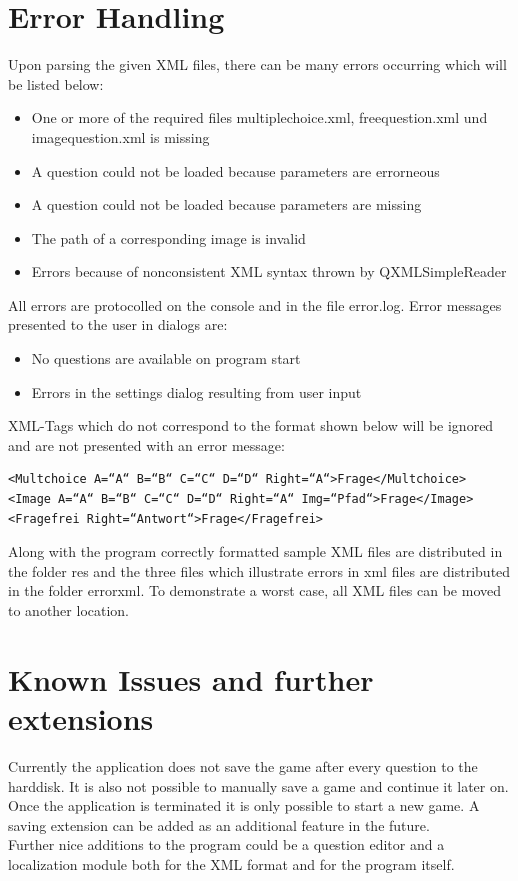 \documentclass[10pt,a4paper,titlepage]{article}
\begin{document}
\section{Error Handling}
Upon parsing the given XML files, there can be many errors occurring which will be listed below:
\begin{itemize}
	\item One or more of the required files multiplechoice.xml, freequestion.xml und imagequestion.xml is missing
	\item A question could not be loaded because parameters are errorneous
	\item A question could not be loaded because parameters are missing
	\item The path of a corresponding image is invalid
	\item Errors because of nonconsistent XML syntax thrown by QXMLSimpleReader
\end{itemize}
All errors are protocolled on the console and in the file error.log. Error messages presented to the user in dialogs are:
\begin{itemize}
	\item No questions are available on program start
	\item Errors in the settings dialog resulting from user input
\end{itemize}
XML-Tags which do not correspond to the format shown below will be ignored and are not presented with an error message:
\begin{lstlisting}[caption=Correct Tags]
<Multchoice A=“A“ B=“B“ C=“C“ D=“D“ Right=“A“>Frage</Multchoice>
<Image A=“A“ B=“B“ C=“C“ D=“D“ Right=“A“ Img=“Pfad“>Frage</Image>
<Fragefrei Right=“Antwort“>Frage</Fragefrei>
\end{lstlisting}
Along with the program correctly formatted sample XML files are distributed in the folder res and the three files which illustrate errors in xml files are distributed in the folder errorxml. To demonstrate a worst case, all XML files can be moved to another location.
\section{Known Issues and further extensions}
Currently the application does not save the game after every question to the harddisk. It is also not possible to manually save a game and continue it later on. Once the application is terminated it is only possible to start a new game. A saving extension can be added as an additional feature in the future.\\
Further nice additions to the program could be a question editor and a localization module both for the XML format and for the program itself.
	
\end{document}
